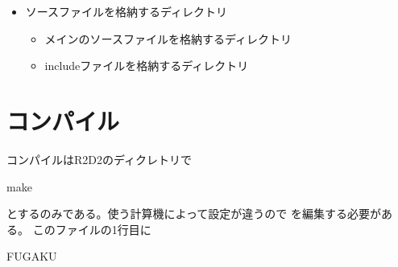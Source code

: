 \documentclass[letterpaper,10pt,dvipdfmx,report]{sphinxmanual}
\begin{document}
\begin{itemize}
\begin{description}
\begin{itemize}
\begin{description}
\end{description}

\item {} \begin{description}
\sphinxAtStartPar
ソースファイルを格納するディレクトリ
\begin{itemize}
\item {} \begin{description}
\sphinxAtStartPar
メインのソースファイルを格納するディレクトリ

\end{description}

\item {} \begin{description}
\sphinxAtStartPar
includeファイルを格納するディレクトリ

\end{description}

\end{itemize}

\end{description}

\end{itemize}

\end{description}

\end{itemize}


\section{コンパイル}
\label{\detokenize{start:id2}}
\sphinxAtStartPar
コンパイルはR2D2のディクレトリで

\begin{sphinxVerbatim}[commandchars=\\\{\}]
make
\end{sphinxVerbatim}

\sphinxAtStartPar
とするのみである。使う計算機によって設定が違うので  を編集する必要がある。
このファイルの1行目に

\begin{sphinxVerbatim}[commandchars=\\\{\}]
FUGAKU
\end{sphinxVerbatim}
\end{document}
